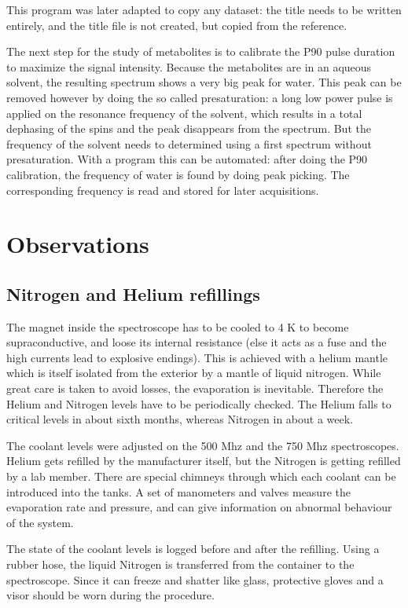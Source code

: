\documentclass[12pt]{article}
\begin{document}
This program was later adapted to copy any dataset: the title needs to be written entirely, and the title file is not created, but copied from the reference.

The next step for the study of metabolites is to calibrate the P90 pulse duration to maximize the signal intensity. Because the metabolites are in an aqueous solvent, the resulting spectrum shows a very big peak for water. This peak can be removed however by doing the so called presaturation: a long low power pulse is applied on the resonance frequency of the solvent, which results in a total dephasing of the spins and the peak disappears from the spectrum. But the frequency of the solvent needs to determined using a first spectrum without presaturation. With a program this can be automated: after doing the P90 calibration, the frequency of water is found by doing peak picking. The corresponding frequency is read and stored for later acquisitions.

\section{Observations}

\subsection{Nitrogen and Helium refillings}

The magnet inside the spectroscope has to be cooled to 4 K to become supraconductive, and loose its internal resistance (else it acts as a fuse and the high currents lead to explosive endings). This is achieved with a helium mantle which is itself isolated from the exterior by a mantle of liquid nitrogen. While great care is taken to avoid losses, the evaporation is inevitable. Therefore the Helium and Nitrogen levels have to be periodically checked. The Helium falls to critical levels in about sixth months, whereas Nitrogen in about a week. 

The coolant levels were adjusted on the 500 Mhz and the 750 Mhz spectroscopes. Helium gets refilled by the manufacturer itself, but the Nitrogen is getting refilled by a lab member. There are special chimneys through which each coolant can be introduced into the tanks. A set of manometers and valves measure the evaporation rate and pressure, and can give information on abnormal behaviour of the system.

The state of the coolant levels is logged before and after the refilling. Using a rubber hose, the liquid Nitrogen is transferred from the container to the spectroscope. Since it can freeze and shatter like glass, protective gloves and a visor should be worn during the procedure. 
\end{document}
